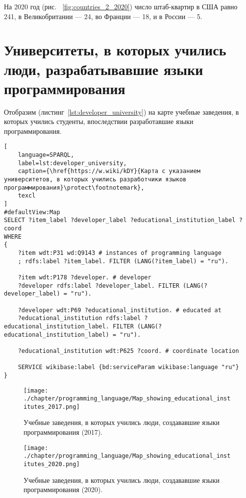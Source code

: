 На 2020 год (рис. ~\ref{fig:countries_2_2020}) число штаб-квартир в США равно 241, в Великобритании — 24, во Франции — 18, и в России — 5.

\section{Университеты, в которых учились люди, разрабатывавшие языки программирования}
Отобразим (листинг~\ref{lst:developer_university}) на карте учебные заведения, в которых учились студенты, впоследствии разработавшие языки программирования.

\begin{lstlisting}[
	language=SPARQL,
	label=lst:developer_university,
	caption={\href{https://w.wiki/kDY}{Карта с указанием университетов, в которых учились разработчики языков программирования}\protect\footnotemark},
	texcl
]
#defaultView:Map
SELECT ?item_label ?developer_label ?educational_institution_label ?coord
WHERE
{
    ?item wdt:P31 wd:Q9143 # instances of programming language
    ; rdfs:label ?item_label. FILTER (LANG(?item_label) = "ru"). 
    
    ?item wdt:P178 ?developer. # developer
    ?developer rdfs:label ?developer_label. FILTER (LANG(?developer_label) = "ru"). 
    	
    ?developer wdt:P69 ?educational_institution. # educated at
    ?educational_institution rdfs:label ?educational_institution_label. FILTER (LANG(?educational_institution_label) = "ru").
    
    ?educational_institution wdt:P625 ?coord. # coordinate location
    
    SERVICE wikibase:label {bd:serviceParam wikibase:language "ru"} 	
}
\end{lstlisting}

\begin{figure}[h]
\centering
	\texttt{[image: ./chapter/programming\_language/Map\_showing\_educational\_institutes\_2017.png]}
	\caption{Учебные заведения, в которых учились люди, создававшие языки программирования (2017).}
	\label{fig:universities_2017}
\end{figure}
\begin{figure}[h]
\centering
	\texttt{[image: ./chapter/programming\_language/Map\_showing\_educational\_institutes\_2020.png]}
	\caption{Учебные заведения, в которых учились люди, создававшие языки программирования (2020).}
	\label{fig:universities_2020}
\end{figure}


